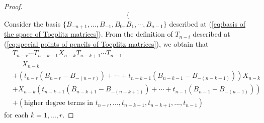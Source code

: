 \documentclass[reqno]{amsart}
\theoremstyle{definition}
\numberwithin{equation}{section}
\begin{document}
\begin{proof}
\begin{equation}
\begin{cases}
        \end{cases}
\end{equation}
 Consider the basis $\{B_{-n+1},...,B_{-1},B_0,B_1,\cdots,B_{n-1}\}$ described at (\ref{eq:basis of the space of Toeplitz matrices}). From the definition of $T_{n-i}$ described at (\ref{eq:special points of pencils of Toeplitz matrices}), we obtain that 
    \begin{equation}\label{eq:calculation of a term of Lpq}
        \begin{aligned}
            &T_{n-r}\cdots T_{n-k-1}X_{n-k}T_{n-k+1}\cdots T_{n-1}\\
            &=X_{n-k}\\
            &+(t_{n-r}(B_{n-r}-B_{-(n-r)})+\cdots+t_{n-k-1}(B_{n-k-1}-B_{-(n-k-1)}))X_{n-k}\\
            &+X_{n-k}(t_{n-k+1}(B_{n-k+1}-B_{-(n-k+1)})+\cdots+t_{n-1}(B_{n-1}-B_{-(n-1)}))\\
            &+(\text{higher degree terms in $t_{n-r},...,t_{n-k-1},t_{n-k+1},...,t_{n-1}$})
        \end{aligned}
    \end{equation}
    for each $k=1,...,r$. 
    

\end{proof}
\end{document}
